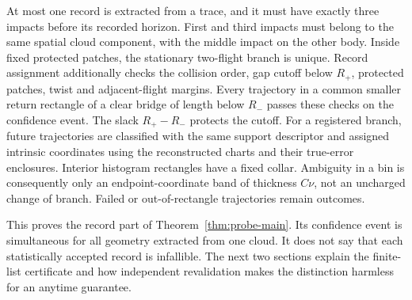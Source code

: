 At most one record is extracted from a trace, and it must have exactly
three impacts before its recorded horizon. First and third impacts must belong to the same spatial cloud component,
with the middle impact on the other body. Inside fixed protected patches,
the stationary two-flight branch is unique. Record assignment additionally
checks the collision order, gap cutoff below $R_+$, protected patches,
twist and adjacent-flight margins. Every trajectory in a common smaller
return rectangle of a clear bridge of length below $R_-$ passes these
checks on the confidence event. The slack $R_+-R_-$ protects the cutoff.
For a registered branch, future trajectories are classified with the
same support descriptor and assigned intrinsic coordinates using the
reconstructed charts and their true-error enclosures. Interior histogram
rectangles have a fixed collar. Ambiguity in a bin is consequently only
an endpoint-coordinate band of thickness $C\nu$, not an uncharged change
of branch. Failed or out-of-rectangle trajectories remain outcomes.

This proves the record part of Theorem~\ref{thm:probe-main}. Its confidence
event is simultaneous for all geometry extracted from one cloud. It does
not say that each statistically accepted record is infallible. The next
two sections explain the finite-list certificate and how independent
revalidation makes the distinction harmless for an anytime guarantee.
